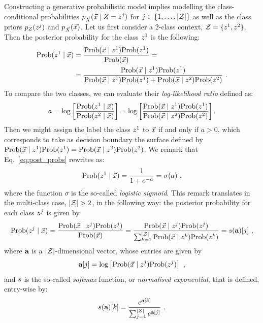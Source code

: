 Constructing a generative probabilistic model implies modelling the class-conditional probabilities $\pdf_{\vaLeakVec}(\given{\vLeakVec}{\sensRandVar = \sensVar^j})$ for $j\in \{1,\dots,\lvert\mathcal{Z}\rvert\}$ as well as the class priors $p_{Z}(z^j)$ and $p_{\vec{X}}(\vec{x})$. Let us first consider a 2-class context, \ie $\mathcal{Z} = \{z^1, z^2\}$. Then the posterior probability for the class $z^1$ is the following:
\begin{align}\label{eq:post_probs}
\prob(\given{\sensVar^1}{\vLeakVec}) &= \frac{\prob(\given{\vLeakVec}{\sensVar^1})\prob(\sensVar^1)}{\prob(\vLeakVec)}=\\
&=\frac{\prob(\given{\vLeakVec}{\sensVar^1})\prob(\sensVar^1)}{\prob(\given{\vLeakVec}{\sensVar^1})\prob(\sensVar^1) + \prob(\given{\vLeakVec}{\sensVar^2})\prob(\sensVar^2)}\mbox{ .}
\end{align}
To compare the two classes, we can evaluate their \emph{log-likelihood ratio} defined as:
\begin{equation}\label{eq:log-ratio}
a = \log\left[\frac{\prob(\given{\sensVar^1}{\vLeakVec})}{\prob(\given{\sensVar^2}{\vLeakVec})}\right] =  \log\left[\frac{\prob(\given{\vLeakVec}{\sensVar^1})\prob(\sensVar^1)}{\prob(\given{\vLeakVec}{\sensVar^2})\prob(\sensVar^2)}\right].
\end{equation}
Then we might assign the label the class $z^1$ to $\vec{x}$  if and only if $a>0$, which corresponds to take as decision boundary the surface defined by $\prob(\given{\vLeakVec}{\sensVar^1})\prob(\sensVar^1) = \prob(\given{\vLeakVec}{\sensVar^2})\prob(\sensVar^2)$.
We remark that Eq.~\eqref{eq:post_probs} rewrites as:
\begin{equation}\label{eq:post_probs_sigmoid}
\prob(\given{\sensVar^1}{\vLeakVec}) = \frac{1}{1+e^{-a}} = \sigma(a)\mbox{ ,}
\end{equation}
where the function $\sigma$ is the so-called \emph{logistic sigmoid}. This remark translates in the multi-class case, \ie $\lvert\mathcal{Z}\rvert >2$, in the following way: the posterior probability for each class $z^j$ is given by
\begin{equation}\label{eq:post_probs_multi-class}
\prob(\given{\sensVar^j}{\vLeakVec})  = \frac{\prob(\given{\vLeakVec}{\sensVar^j})\prob(\sensVar^j)}{\prob(\vLeakVec)} = \frac{\prob(\given{\vLeakVec}{\sensVar^j})\prob(\sensVar^j)}{\sum_{k=1}^{\nbClasses}\prob(\given{\vLeakVec}{\sensVar^k})\prob(\sensVar^k )} = \softmax (\aaa)[j]\mbox{ ,}
\end{equation}
where $\textbf{a}$ is a $\lvert\mathcal{Z}\rvert$-dimensional vector, whose entries are given by
\begin{equation}\label{eq:softmax_entries}
\aaa[j] = \log\left[ \prob(\given{\vLeakVec}{\sensVar^j})\prob(\sensVar^j) \right] \mbox{ ,}
\end{equation}
and $s$ is the so-called \emph{softmax} function, or \emph{normalised exponential}, that is defined, entry-wise by:
\begin{equation}\label{eq:softmax}
s(\textbf{a})[k] = \frac{e^{\textbf{a}[k]}}{\sum_{j=1}^{\lvert\mathcal{Z}\rvert}e^{\textbf{a}[j]}}\mbox{ .}
\end{equation}

